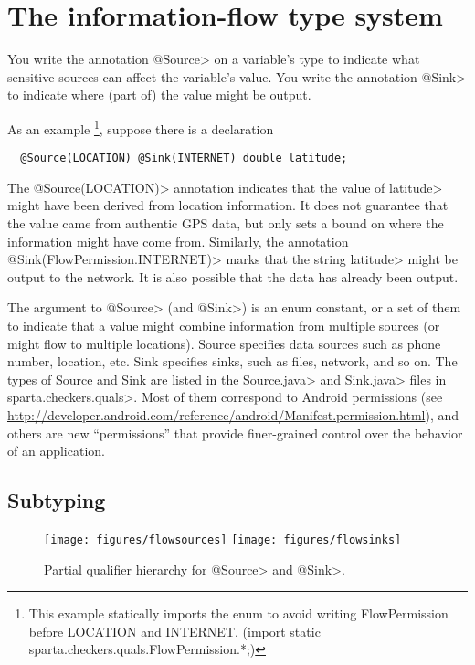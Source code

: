 \section{The information-flow type system\label{sec:flow-type-system}}

You write the annotation \<@Source> on a variable's
type to indicate what sensitive sources can affect the variable's value.
You write the annotation \<@Sink> to indicate where (part of) the
value might be output.

As an example
\footnote{This example statically imports the enum to avoid writing FlowPermission before LOCATION and INTERNET. (import static sparta.checkers.quals.FlowPermission.*;)}, suppose there is a declaration
\begin{Verbatim}
  @Source(LOCATION) @Sink(INTERNET) double latitude;
\end{Verbatim}
\noindent
The \<@Source(LOCATION)> annotation indicates that the
value of \<latitude> might have been derived from
location information.  It does not guarantee that the value came from
authentic GPS data, but only sets a bound on where the information might
have come from.
Similarly, the annotation \<@Sink(FlowPermission.INTERNET)> marks that
the string \<latitude> might be output to the network.  It is also
possible that the data has already been output.

The argument to \<@Source> (and \<@Sink>) is an enum constant, or a
set of them to indicate that a value might combine information from
multiple sources (or might flow to multiple locations).
Source specifies data sources such as phone number, location, 
etc.  Sink specifies sinks, such as files, network, and so on.
The types of Source and Sink are listed in the
\<Source.java> and \<Sink.java> files in \<sparta.checkers.quals>.
Most of them correspond to Android permissions (see 
\url{http://developer.android.com/reference/android/Manifest.permission.html}),
and others are new ``permissions'' that provide finer-grained control over
the behavior of an application.


\subsection{Subtyping\label{sec:subtyping}}

\begin{figure}
\centerline{\texttt{[image: figures/flowsources]}%
  \hfill%
  \texttt{[image: figures/flowsinks]}}
\caption{Partial qualifier hierarchy for \<@Source> and \<@Sink>.}
\label{fig:flow-hierarchy}
\end{figure}


